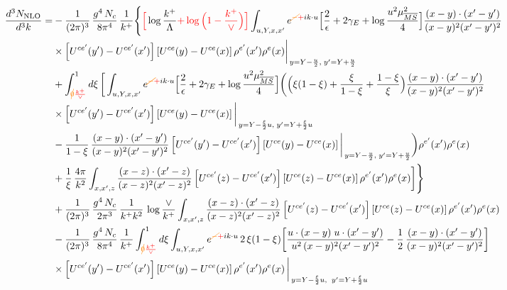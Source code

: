 \documentclass[9pt]{article}
\numberwithin{equation}{section}
\begin{document}
\begin{align}
\frac{d^{3}N_{\rm NLO}}{d^{3}k}= &-\frac{1}{(2\pi)^{3}}\,\frac{g^{4}\,N_{c}}{8\pi^{4}}\,\frac{1}{k^{+}}\Bigg\{{\color{red}\Big[}\log\frac{k^{+}}{\Lambda}{\color{red}+\log\Big(1-\frac{k^{+}}{\vee}\Big)\Big]}\int_{u,Y,x,x'}e^{{\color{orange}\cancel{-}}{\color{red}+}ik\cdot u}\Big[\frac{2}{\epsilon}+2\gamma_{E}+\log\frac{u^{2}\mu^{2}_{\overline{MS}}}{4}\Big]\frac{(x-y)\cdot(x'-y')}{(x-y)^{2}(x'-y')^{2}}\notag\\
&\times\left[U^{ce'}(y') - U^{ce'}(x')\right]\left[U^{ce}(y) - U^{ce}(x)\right]\rho^{e'}(x')\rho^{e}(x)\bigg|_{\,y=Y-\frac{u}{2},\;y'=Y+\frac{u}{2}}\notag\\
&+\int_{{\color{orange}\cancel{0}}{\color{red}\frac{k^{+}}{\vee}}}^{1}d\xi\,\bigg[\int_{u,Y,x,x'}e^{{\color{orange}\cancel{-}}{\color{red}+}ik\cdot u}\Big[\frac{2}{\epsilon}+2\gamma_{E}+\log\frac{u^{2}\mu^{2}_{\overline{MS}}}{4}\Big]\bigg(\Big(\xi(1-\xi)+\frac{\xi}{1-\xi}+\frac{1-\xi}{\xi}\Big)\frac{(x-y)\cdot(x'-y')}{(x-y)^{2}(x'-y')^{2}}\notag\\
&\times\left[U^{ce'}(y') - U^{ce'}(x')\right]\left[U^{ce}(y) - U^{ce}(x)\right]\bigg|_{\,y=Y-\frac{\xi}{2}u,\;y'=Y+\frac{\xi}{2}u}\notag\\
&-\frac{1}{1-\xi}\,\frac{(x-y)\cdot(x'-y')}{(x-y)^{2}(x'-y')^{2}}\left[U^{ce'}(y') - U^{ce'}(x')\right]\left[U^{ce}(y) - U^{ce}(x)\right]\bigg|_{\,y=Y-\frac{u}{2},\;y'=Y+\frac{u}{2}}\bigg)\rho^{e'}(x')\rho^{e}(x)\notag\\
&+\frac{1}{\xi}\,\frac{4\pi}{k^{2}}\int_{x,x',z}\frac{(x-z)\cdot(x'-z)}{(x-z)^{2}(x'-z)^{2}}\left[U^{ce'}(z) - U^{ce'}(x')\right]\left[U^{ce}(z) - U^{ce}(x)\right]\rho^{e'}(x')\rho^{e}(x)\bigg]\Bigg\}\notag\\
&+\frac{1}{(2\pi)^{3}}\,\frac{g^{4}\,N_{c}}{2\pi^{3}}\,\frac{1}{k^{+}k^{2}}\,\log\frac{\vee}{k^{+}}\int_{x,x',z}\frac{(x-z)\cdot(x'-z)}{(x-z)^{2}(x'-z)^{2}}\left[U^{ce'}(z) - U^{ce'}(x')\right]\left[U^{ce}(z) - U^{ce}(x)\right]\rho^{e'}(x')\rho^{e}(x)\notag\\
&-\frac{1}{(2\pi)^{3}}\,\frac{g^{4}\,N_{c}}{8\pi^{4}}\,\frac{1}{k^{+}}\int_{{\color{orange}\cancel{0}}{\color{red}\frac{k^{+}}{\vee}}}^{1}d\xi\int_{u,Y,x,x'}e^{{\color{orange}\cancel{-}}{\color{red}+}ik\cdot u}\,2\,\xi(1-\xi)\bigg[\frac{u\cdot(x-y)\;u\cdot(x'-y')}{u^{2}\,(x-y)^{2}(x'-y')^{2}}-\frac{1}{2}\,\frac{(x-y)\cdot(x'-y')}{(x-y)^{2}(x'-y')^{2}}\bigg]\notag\\
&\times\left[U^{ce'}(y') - U^{ce'}(x')\right]\left[U^{ce}(y) - U^{ce}(x)\right]\rho^{e'}(x')\rho^{e}(x)\,\bigg|_{\,y=Y-\frac{\xi}{2}u,\;\;y'=Y+\frac{\xi}{2}u}
\end{align}
\end{document}

